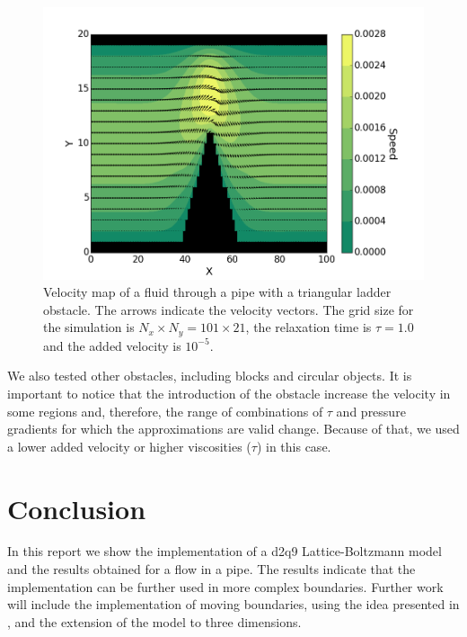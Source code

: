 \documentclass[aps,prl,reprint,groupedaddress]{revtex4-1}
\begin{document}
\begin{figure}[ht]
	\includegraphics[scale=0.4]{arrows.png}
	\caption{Velocity map of a fluid through a pipe with a triangular ladder obstacle. The arrows indicate the velocity vectors. The grid size for the simulation is $N_x \times N_y = 101 \times 21$, the relaxation time is $\tau=1.0$ and the added velocity is $10^{-5}$. \label{arrows}}
\end{figure}

We also tested other obstacles, including blocks and circular objects. It is important to notice that the introduction of the obstacle increase the velocity in some regions and, therefore, the range of combinations of $\tau$ and pressure gradients for which the approximations are valid change. Because of that, we used a lower added velocity or higher viscosities ($\tau$) in this case.

\section{Conclusion \label{conclusion}}

In this report we show the implementation of a d2q9 Lattice-Boltzmann model and the results obtained for a flow in a pipe. The results indicate that the implementation can be further used in more complex boundaries. Further work will include the implementation of moving boundaries, using the idea presented in \cite{Kang2008}, and the extension of the model to three dimensions.

\end{document}
